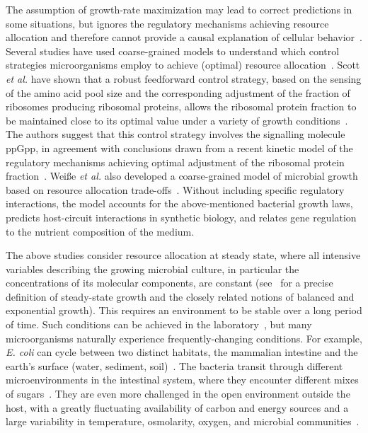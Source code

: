 The assumption of growth-rate maximization may lead to correct predictions in some situations, but ignores the regulatory mechanisms achieving resource allocation and therefore cannot provide a causal explanation of cellular behavior~\cite{kremling_understanding_2015}.
Several studies have used coarse-grained models to understand which control strategies microorganisms employ to achieve (optimal) resource allocation~\cite{bosdriesz_how_2015,scott_emergence_2014,weisse_mechanistic_2015}.
Scott \textit{et al.} have shown that a robust feedforward control strategy, based on the sensing of the amino acid pool size and the corresponding adjustment of the fraction of ribosomes producing ribosomal proteins, allows the ribosomal protein fraction to be maintained close to its optimal value under a variety of growth conditions~\cite{scott_emergence_2014}.
The authors suggest that this control strategy involves the signalling molecule ppGpp, in agreement with conclusions drawn from a recent kinetic model of the regulatory mechanisms achieving optimal adjustment of the ribosomal protein fraction~\cite{bosdriesz_how_2015}.
Wei{\ss}e \textit{et al.} also developed a coarse-grained model of microbial growth based on resource allocation trade-offs~\cite{weisse_mechanistic_2015}. 
Without including specific regulatory interactions, the model accounts for the above-mentioned bacterial growth laws, predicts host-circuit interactions in synthetic biology, and relates gene regulation to the nutrient composition of the medium.

The above studies consider resource allocation at steady state, where all intensive variables describing the growing microbial culture, in particular the concentrations of its molecular components, are constant (see~\cite{fishov_microbial_1995} for a precise definition of steady-state growth and the closely related notions of balanced and exponential growth).
This requires an environment to be stable over a long period of time.
Such conditions can be achieved in the laboratory~\cite{borirak_molecular_2014}, but many microorganisms naturally experience frequently-changing conditions.
For example, \textit{E. coli} can cycle between two distinct habitats, the mammalian intestine and the earth's surface (water, sediment, soil)~\cite{savageau_escherichia_1983}.
The bacteria transit through different microenvironments in the intestinal system, where they encounter different mixes of sugars~\cite{savageau_demand_1998}.
They are even more challenged in the open environment outside the host, with a greatly fluctuating availability of carbon and energy sources and a large variability in temperature, osmolarity, oxygen, and microbial communities~\cite{blount_unexhausted_2015,vanelsas_survival_2011}.

